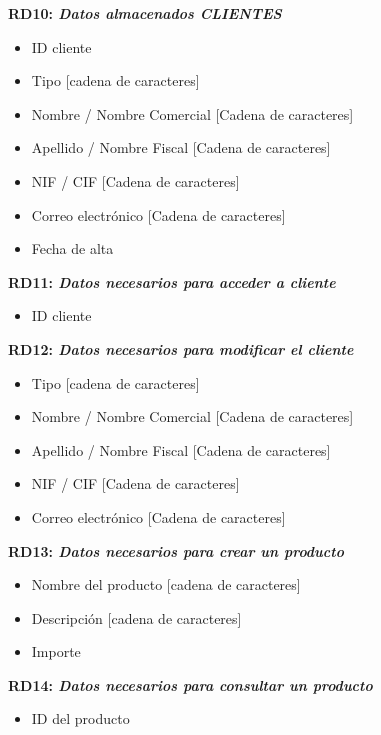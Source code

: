 \documentclass[paper=a4, fontsize=11pt, spanish]{scrartcl}
\begin{document}
\setlength{\parindent}{0em}
\textbf{RD10: \textit{Datos almacenados CLIENTES}}
\setlength{\parindent}{2em}
\begin{itemize}
\item ID cliente
\item Tipo [cadena de caracteres]
\item Nombre / Nombre Comercial [Cadena de caracteres]
\item Apellido / Nombre Fiscal [Cadena de caracteres]
\item NIF / CIF [Cadena de caracteres]
\item Correo electrónico [Cadena de caracteres]
\item Fecha de alta
\end{itemize}

\setlength{\parindent}{0em}
\textbf{RD11: \textit{Datos necesarios para acceder a cliente}}
\setlength{\parindent}{2em}
\begin{itemize}
\item ID cliente
\end{itemize}

\setlength{\parindent}{0em}
\textbf{RD12: \textit{Datos necesarios para modificar el cliente}}
\setlength{\parindent}{2em}
\begin{itemize}
\item Tipo [cadena de caracteres]
\item Nombre / Nombre Comercial [Cadena de caracteres]
\item Apellido / Nombre Fiscal [Cadena de caracteres]
\item NIF / CIF [Cadena de caracteres]
\item Correo electrónico [Cadena de caracteres]
\end{itemize}

\setlength{\parindent}{0em}
	\textbf{RD13: \textit{Datos necesarios para crear un producto}}
	\setlength{\parindent}{2em}
	\begin{itemize}
		\item Nombre del producto [cadena de caracteres]
		\item Descripción [cadena de caracteres]
		\item Importe
	\end{itemize}

	\setlength{\parindent}{0em}
	\textbf{RD14: \textit{Datos necesarios para consultar un producto}}
	\setlength{\parindent}{2em}
	\begin{itemize}
		\item ID del producto
	\end{itemize}
\end{document}
